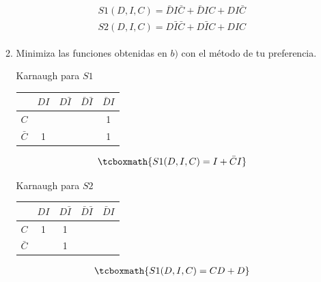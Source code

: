 \documentclass[11pt,letterpaper]{article}
\begin{document}
\begin{enumerate}
\begin{enumerate}
                \begin{equation*} \begin{split} \begin{gathered}
                    S1(D, I, C) = \bar{D}I\bar{C} + \bar{D}IC + DI\bar{C} \\
                    S2(D, I, C) = D\bar{I}\bar{C} + D\bar{I}C + DIC
                \end{gathered} \end{split} \end{equation*}
            \item Minimiza las funciones obtenidas en $b)$ con el método de tu preferencia.
                \begin{center}
                    Karnaugh para $S1$ \\
                    {\tabulinesep=1.2mm \begin{tabu} { c | c c c c }
                        & $DI$ & $D\bar{I}$ & $\bar{D}\bar{I}$ & $\bar{D}I$ \\
                        \hline
                        $C$ &  &   &   & 1 \\
                        $\bar{C}$ & 1 &   &   & 1 \\
                    \end{tabu}}
                \end{center}
                \begin{equation*} \begin{split} \begin{gathered}
                    \tcboxmath{S1(D, I, C) = I + \bar{C}I}
                \end{gathered} \end{split} \end{equation*}
                \clearpage
                \begin{center}
                    Karnaugh para $S2$ \\
                    {\tabulinesep=1.2mm \begin{tabu} { c | c c c c }
                        & $DI$ & $D\bar{I}$ & $\bar{D}\bar{I}$ & $\bar{D}I$ \\
                        \hline
                        $C$ & 1 & 1 &  & \\
                        $\bar{C}$ &  & 1 &   &  \\
                    \end{tabu}}
                \end{center}
                \begin{equation*} \begin{split} \begin{gathered}
                    \tcboxmath{S1(D, I, C) = CD + D}
                \end{gathered} \end{split} \end{equation*}
        \end{enumerate}

\end{enumerate}
\end{document}
